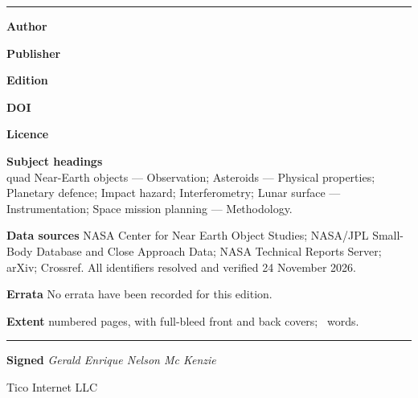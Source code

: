 \clearpage
\thispagestyle{empty}
\vspace*{0.45in}
\begin{center}
\begin{minipage}{0.92\textwidth}
{\sffamily\fontsize{15}{18}\selectfont\bfseries\color{txt} \bookTitle\par}
\vspace{4pt}
{\sffamily\small\color{txtdim} \bookSubtitle\par}
\vspace{18pt}
{\color{accent}\rule{\textwidth}{1.6pt}}\par
\vspace{14pt}
{\small\color{txt}
\noindent\textbf{Author}\quad \bookAuthor\par
\vspace{4pt}
\noindent\textbf{Publisher}\quad \bookImprint\par
\vspace{4pt}
\noindent\textbf{Edition}\quad \bookEdition\par
\vspace{4pt}
\noindent\textbf{DOI}\quad \href{https://doi.org/\bookDOI}{\texttt{\bookDOI}}\par
\vspace{4pt}
\noindent\textbf{Licence}\quad \bookLicense\par
\vspace{14pt}
\noindent\textbf{Subject headings}\\quad
Near-Earth objects --- Observation; Asteroids --- Physical properties;
Planetary defence; Impact hazard; Interferometry; Lunar surface ---
Instrumentation; Space mission planning --- Methodology.\par
\vspace{14pt}
\noindent\textbf{Data sources}\quad
NASA Center for Near Earth Object Studies; NASA/JPL Small-Body Database and
Close Approach Data; NASA Technical Reports Server; arXiv; Crossref. All
identifiers resolved and verified 24 November 2026.\par
\vspace{14pt}
\noindent\textbf{Errata}\quad
No errata have been recorded for this edition.\par
\vspace{14pt}
\noindent\textbf{Extent}\quad
\bookPages{} numbered pages, with full-bleed front and back
covers;\ \bookWords{} words.\par
\vspace{14pt}
\noindent\rule{\textwidth}{0.4pt}\par
\vspace{10pt}
\noindent\textbf{Signed}\quad
\emph{Gerald Enrique Nelson Mc Kenzie}\par
\vspace{4pt}
\noindent Tico Internet LLC\par
\vspace{4pt}
\noindent \bookFactsDate\par
}
\end{minipage}
\end{center}
